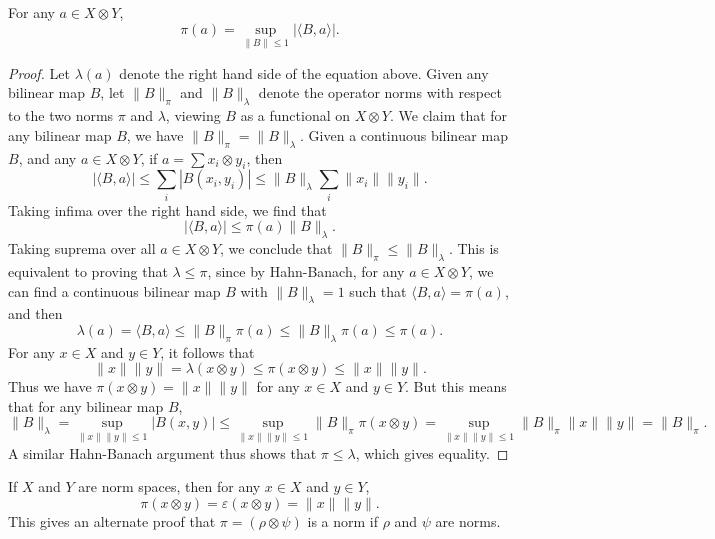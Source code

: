 \begin{lemma}
    For any $a \in X \otimes Y$,
    \[ \pi(a) = \sup_{\| B \| \leq 1} |\langle B, a \rangle|. \]
\end{lemma}
\begin{proof}
    Let $\lambda(a)$ denote the right hand side of the equation above. Given any bilinear map $B$, let $\| B \|_\pi$ and $\| B \|_\lambda$ denote the operator norms with respect to the two norms $\pi$ and $\lambda$, viewing $B$ as a functional on $X \otimes Y$. We claim that for any bilinear map $B$, we have $\| B \|_\pi = \| B \|_\lambda$. Given a continuous bilinear map $B$, and any $a \in X \otimes Y$, if $a = \sum x_i \otimes y_i$, then
    \[ |\langle B, a \rangle| \leq \sum_i |B(x_i,y_i)| \leq \| B \|_\lambda \sum_i \| x_i \| \| y_i \|. \]
    Taking infima over the right hand side, we find that
    \[ |\langle B, a \rangle| \leq \pi(a) \| B \|_\lambda. \]
    Taking suprema over all $a \in X \otimes Y$, we conclude that $\| B \|_\pi \leq \| B \|_\lambda$. This is equivalent to proving that $\lambda \leq \pi$, since by Hahn-Banach, for any $a \in X \otimes Y$, we can find a continuous bilinear map $B$ with $\| B \|_\lambda = 1$ such that $\langle B, a \rangle = \pi(a)$, and then
    \[ \lambda(a) = \langle B, a \rangle \leq \| B \|_\pi \pi(a) \leq \| B \|_\lambda \pi(a) \leq \pi(a). \]
    For any $x \in X$ and $y \in Y$, it follows that
    \[ \| x \| \| y \| = \lambda(x \otimes y) \leq \pi(x \otimes y) \leq \| x \| \| y \|. \]
    Thus we have $\pi(x \otimes y) = \| x \| \| y \|$ for any $x \in X$ and $y \in Y$. But this means that for any bilinear map $B$,
    \[ \| B \|_\lambda = \sup_{\| x \| \| y \| \leq 1} |B(x,y)| \leq \sup_{\| x \| \| y \| \leq 1} \| B \|_\pi \pi(x \otimes y) = \sup_{\| x \| \| y \| \leq 1} \| B \|_\pi \| x \| \| y \| = \| B \|_\pi. \]
    A similar Hahn-Banach argument thus shows that $\pi \leq \lambda$, which gives equality.
\end{proof}

\begin{corollary}
    If $X$ and $Y$ are norm spaces, then for any $x \in X$ and $y \in Y$,
    \[ \pi(x \otimes y) = \varepsilon(x \otimes y) = \| x \| \| y \|. \]
    This gives an alternate proof that $\pi = (\rho \otimes \psi)$ is a norm if $\rho$ and $\psi$ are norms.
\end{corollary}

